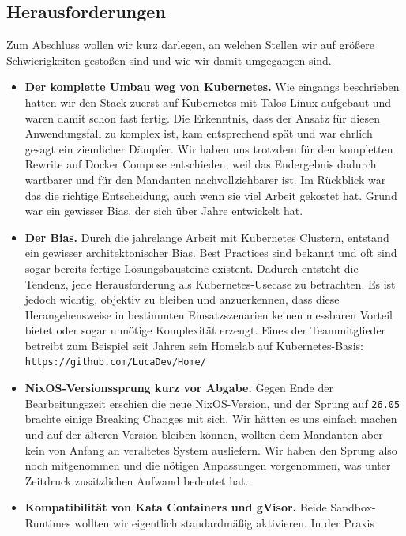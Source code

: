 \subsection{Herausforderungen}
\label{sec:apphost-herausforderungen}

Zum Abschluss wollen wir kurz darlegen, an welchen Stellen wir auf
größere Schwierigkeiten gestoßen sind und wie wir damit umgegangen sind.

\begin{itemize}
  \item \textbf{Der komplette Umbau weg von Kubernetes.} Wie eingangs
    beschrieben hatten wir den Stack zuerst auf Kubernetes mit Talos Linux
    aufgebaut und waren damit schon fast fertig. Die Erkenntnis, dass der Ansatz
    für diesen Anwendungsfall zu komplex ist, kam entsprechend spät und war
    ehrlich gesagt ein ziemlicher Dämpfer. Wir haben uns trotzdem für den
    kompletten Rewrite auf Docker Compose entschieden, weil das Endergebnis
    dadurch wartbarer und für den Mandanten nachvollziehbarer ist. Im Rückblick
    war das die richtige Entscheidung, auch wenn sie viel Arbeit gekostet hat. Grund war ein gewisser Bias, der sich über Jahre entwickelt hat.
  \item \textbf{Der Bias.} Durch die jahrelange Arbeit mit Kubernetes Clustern, entstand ein gewisser architektonischer Bias. Best Practices sind bekannt und oft sind sogar bereits fertige Lösungsbausteine existent. Dadurch entsteht die Tendenz, jede Herausforderung als Kubernetes-Usecase zu betrachten. Es ist jedoch wichtig, objektiv zu bleiben und anzuerkennen, dass diese Herangehensweise in bestimmten Einsatzszenarien keinen messbaren Vorteil bietet oder sogar unnötige Komplexität erzeugt.
  Eines der Teammitglieder betreibt zum Beispiel seit Jahren sein Homelab auf Kubernetes-Basis: \texttt{https://github.com/LucaDev/Home/}
  \item \textbf{NixOS-Versionssprung kurz vor Abgabe.} Gegen Ende der
    Bearbeitungszeit erschien die neue NixOS-Version, und der Sprung auf
    \texttt{26.05} brachte einige Breaking Changes mit sich. Wir hätten es uns
    einfach machen und auf der älteren Version bleiben können, wollten dem
    Mandanten aber kein von Anfang an veraltetes System ausliefern. Wir haben den
    Sprung also noch mitgenommen und die nötigen Anpassungen vorgenommen, was
    unter Zeitdruck zusätzlichen Aufwand bedeutet hat.
  \item \textbf{Kompatibilität von Kata Containers und gVisor.} Beide Sandbox-
    Runtimes wollten wir eigentlich standardmäßig aktivieren. In der Praxis

\end{itemize}
